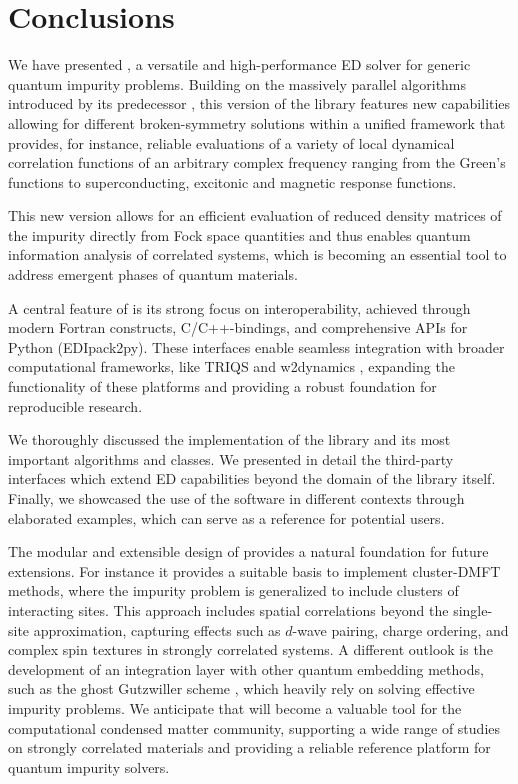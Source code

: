 \documentclass[edipack_sp.tex]{subfiles}
\begin{document}
\section{Conclusions}\label{SecConclusions}
We have presented \NAME{}, a versatile and high-performance ED solver for generic quantum impurity problems. Building on the massively
parallel algorithms introduced by its predecessor \cite{Amaricci2022CPC}, this version of
the library features new capabilities allowing for different broken-symmetry solutions within a unified
framework that provides, for instance, reliable evaluations of a variety of local dynamical correlation
functions of an arbitrary complex frequency ranging from the Green's functions to superconducting, excitonic and magnetic response functions.

This new version allows for an efficient evaluation of 
reduced density matrices of the impurity directly from Fock space quantities and thus enables  
quantum information analysis of correlated systems, which is becoming an essential tool to address emergent phases of quantum materials.

A central feature of \NAME is its strong focus on interoperability,
achieved through modern Fortran constructs, C/C++-bindings, and
comprehensive APIs for Python (EDIpack2py). 
These interfaces enable seamless integration with broader
computational frameworks, like TRIQS \cite{Parcollet2015CPC} and
w2dynamics \cite{Wallerberger2019CPC}, expanding the
functionality of these platforms and providing a robust foundation for
reproducible research.

We thoroughly discussed the implementation of the \NAME library and its
most important algorithms and classes. We presented in
detail the third-party interfaces which extend ED
capabilities beyond the domain of the library itself. 
Finally, we showcased the use of the \NAME software in different
contexts through elaborated examples, which can serve as a reference for potential users. 

The modular and extensible design of \NAME provides a
natural foundation for future extensions.
For instance it provides a suitable basis to implement cluster-DMFT \cite{Capone2004PRB,Kotliar2006RMP,Park2008PRL} methods, where the
impurity problem is generalized to include clusters of interacting
sites. This approach includes spatial correlations beyond the single-site approximation, capturing effects
such as $d$-wave pairing, charge ordering, and complex spin textures in strongly correlated systems.
A different outlook is the development of an integration layer with other quantum embedding methods, such as the ghost Gutzwiller scheme \cite{Lanata2015PRX},
which heavily rely on solving effective impurity problems.    
We anticipate that \NAME will become a valuable tool for the computational condensed matter community, supporting a wide range of
studies on strongly correlated materials and providing a reliable
reference platform for quantum impurity solvers.
\end{document}
